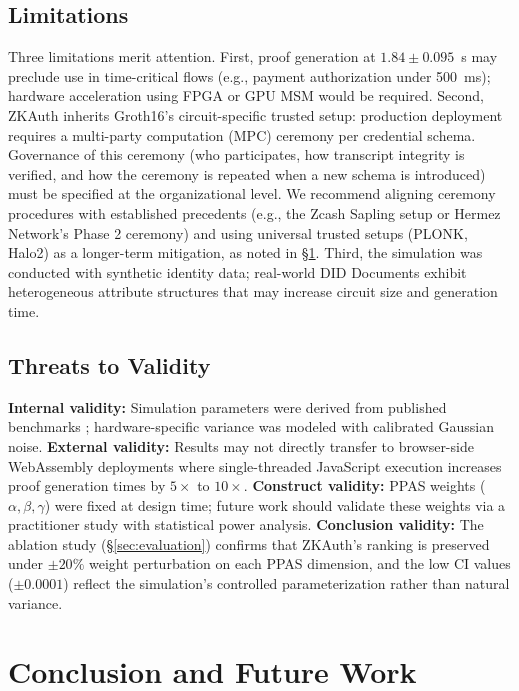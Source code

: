\documentclass[journal,12pt,onecolumn]{IEEEtran}
\begin{document}
\subsection{Limitations}

Three limitations merit attention. First, proof generation at
$1.84 \pm 0.095$~s may preclude use in time-critical flows (e.g.,
payment authorization under 500~ms); hardware acceleration using FPGA
or GPU MSM would be required. Second, ZKAuth inherits Groth16's circuit-specific trusted setup:
production deployment requires a multi-party computation (MPC) ceremony
per credential schema. Governance of this ceremony (who
participates, how transcript integrity is verified, and how the
ceremony is repeated when a new schema is introduced) must be
specified at the organizational level. We recommend aligning ceremony
procedures with established precedents (e.g., the Zcash Sapling setup
or Hermez Network's Phase 2 ceremony) and using universal trusted
setups (PLONK, Halo2) as a longer-term mitigation, as noted in
§\ref{sec:conclusion}. Third, the simulation was conducted with
synthetic identity data; real-world DID Documents exhibit
heterogeneous attribute structures that may increase circuit size and
generation time.

\subsection{Threats to Validity}

\textbf{Internal validity:} Simulation parameters were derived from
published benchmarks \cite{groth2016size,bunz2018bulletproofs,
bensasson2019scalable}; hardware-specific variance was modeled with
calibrated Gaussian noise. \textbf{External validity:} Results may not
directly transfer to browser-side WebAssembly deployments where
single-threaded JavaScript execution increases proof generation
times by $5\times$ to $10\times$. \textbf{Construct validity:} PPAS weights
($\alpha, \beta, \gamma$) were fixed at design time; future work should
validate these weights via a practitioner study with statistical power
analysis. \textbf{Conclusion validity:} The ablation study (§\ref{sec:evaluation})
confirms that ZKAuth's ranking is preserved under $\pm 20\%$ weight
perturbation on each PPAS dimension, and the low CI values
($\pm 0.0001$) reflect the simulation's controlled parameterization
rather than natural variance.

\section{Conclusion and Future Work}
\label{sec:conclusion}
\end{document}
